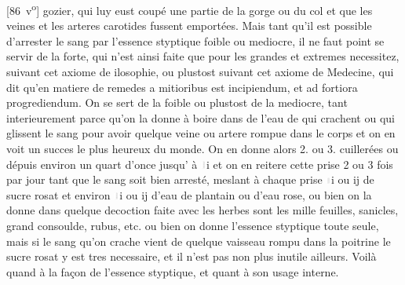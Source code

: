[86~v\textsuperscript{o}] gozier, qui luy eust coup\'{e} une partie de la gorge ou du col et que les veines et les arteres carotides fussent emport\'{e}es.
\pend%
\count{}
\pstart%
Mais tant qu'il est possible d'arrester le sang par l'essence styptique foible ou mediocre, il ne faut point se servir de la forte, qui n'est ainsi faite que pour les grandes et extremes necessitez, suivant cet axiome de ilosophie, 
ou plustost suivant cet axiome de Medecine, qui dit qu'en matiere de remedes a mitioribus est incipiendum, et ad fortiora progrediendum. On se sert de la foible ou plustost de la mediocre, tant interieurement parce qu'on la donne \`{a} boire dans de l'eau de
%
{}
qui crachent ou qui glissent le sang pour avoir quelque veine ou artere rompue dans le corps et on en voit un succes le plus heureux du monde. On en donne alors 2. ou 3. cuiller\'{e}es ou d\'{e}puis environ un quart d'once jusqu' \`{a} \includegraphics[width=0.014\textwidth]{images/uncia.pdf}i et on en reitere cette prise 2 ou 3 fois par jour tant que le sang soit bien arrest\'{e}, meslant \`{a} chaque prise \includegraphics[width=0.013\textwidth]{images/drachma.pdf}i ou ij de sucre rosat et environ \includegraphics[width=0.014\textwidth]{images/uncia.pdf}i ou ij d'eau de plantain ou d'eau rose, ou bien on la donne dans quelque decoction faite avec les herbes
sont les mille feuilles, sanicles, grand consoulde, rubus, etc. ou bien on donne l'essence styptique toute seule, mais si le sang qu'on crache vient de quelque vaisseau rompu dans la poitrine le sucre rosat y est tres necessaire, et il n'est pas non plus inutile ailleurs. Voil\`{a} quand \`{a} la fa\c{c}on de l'essence styptique, et quant \`{a} son usage interne.
